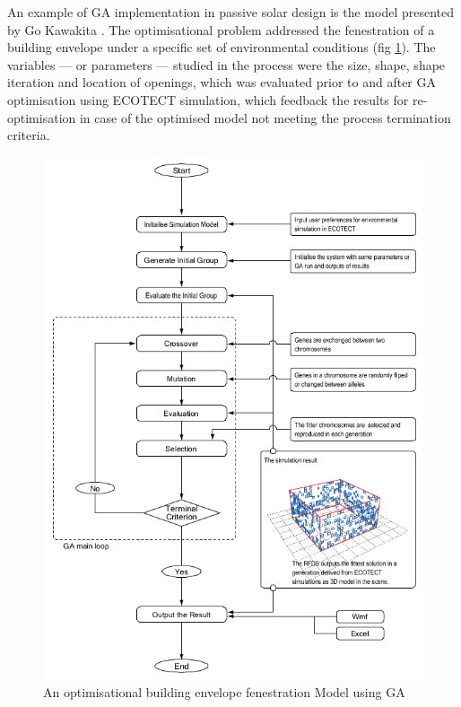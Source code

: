 An example of GA implementation in passive solar design is the model presented by Go Kawakita \cite{kawakita08}. The optimisational problem addressed the fenestration of a building envelope under a specific set of environmental conditions (fig \ref{kawakitaGA}). The variables --- or parameters --- studied in the process were the size, shape, shape iteration and location of openings, which was evaluated prior to and after GA optimisation using ECOTECT simulation, which feedback the results for re-optimisation in case of the optimised model not meeting the process termination criteria.

\begin{figure}[hbtp]
\centering
\includegraphics[width=\textwidth]{./Chapter3/Images/16-kawakitaGA}
\caption[GA Fenestration Optimisation Model]{An optimisational building envelope fenestration Model using GA \cite{kawakita08}}
\label{kawakitaGA}
\end{figure}

